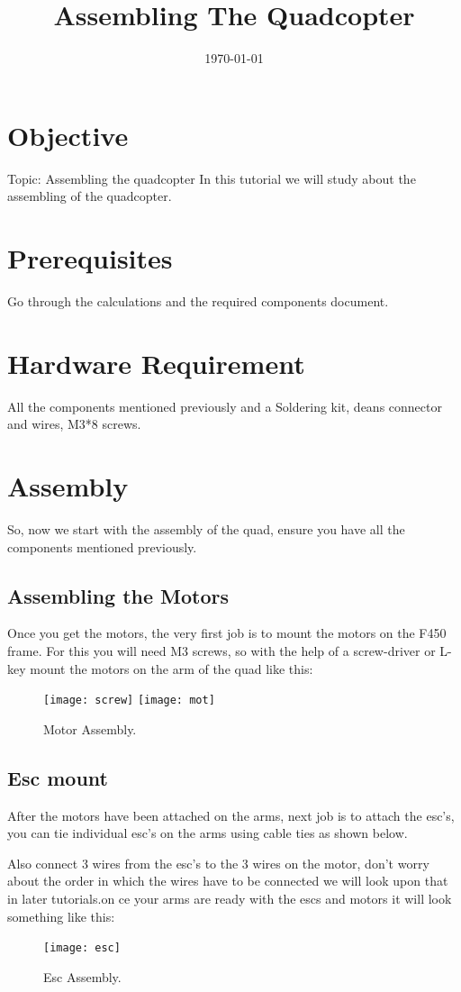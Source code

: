 \documentclass[11pt,a4paper]{article}
\title{Assembling The Quadcopter}
\author{}
\date{\today}
\begin{document}
	\maketitle
	\newpage
	\tableofcontents
	\newpage
	\section{Objective}
	Topic: Assembling the quadcopter
		In this tutorial we will study about the assembling of the quadcopter.
	\section{Prerequisites}
	 Go through the calculations and the required components document.
	\section{Hardware Requirement}
	 All the components mentioned previously and a Soldering kit, deans connector and wires, M3*8 screws.
	\section{Assembly}
	 So, now we start with the assembly of the quad, ensure you have all the components mentioned previously.
	 \subsection{Assembling the Motors}
	 	Once you get the motors, the very first job is to mount the motors on the F450 frame. For this you will need M3 screws, so with the help of a screw-driver or L-key mount the motors on the arm of the quad like this:
	 	\begin{figure}[h]
	 	
	 	\centering
		\texttt{[image: screw]}
	 	\texttt{[image: mot]}
	 	\caption{Motor Assembly.}
\end{figure}
	 	\subsection{Esc mount}
	 	After the motors have been attached on the arms, next job is to attach the esc's, you can tie individual esc's on the arms using cable ties as shown below.
		 	
	 	 Also connect 3 wires from the esc's to the 3 wires on the motor, don't worry about the order in which the wires have to be connected we will look upon that in later tutorials.on ce your arms are ready with the escs and motors it will look something like this:
	 	 \begin{figure}[h]
	 	
	 	\centering
		\texttt{[image: esc]}
		\caption{Esc Assembly.}
		\end{figure}
		
\end{document}
